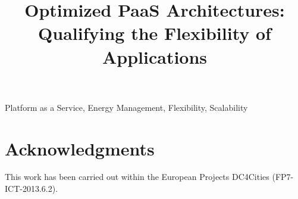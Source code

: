 \documentclass[10pt, conference, compsocconf]{IEEEtran}
\begin{document}
\title{Optimized PaaS Architectures: Qualifying the Flexibility of Applications}

\author{
}

\maketitle
\begin{abstract}

\end{abstract}

\begin{IEEEkeywords}
Platform as a Service, Energy Management, Flexibility, Scalability
\end{IEEEkeywords}








\section*{Acknowledgments}

This work has been carried out within the European Projects DC4Cities (FP7-ICT-2013.6.2).



\end{document}
